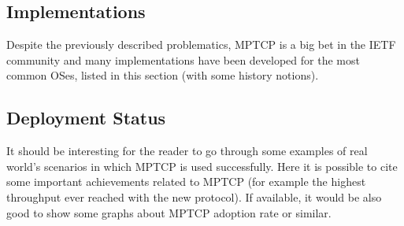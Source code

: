 \subsection{Implementations}
Despite the previously described problematics, MPTCP is a big bet in the IETF community and many implementations have been developed for the most common OSes, listed in this section (with some history notions).

\subsection{Deployment Status}
It should be interesting for the reader to go through some examples of real world's scenarios in which MPTCP is used successfully. Here it is possible to cite some important achievements related to MPTCP (for example the highest throughput ever reached with the new protocol).
If available, it would be also good to show some graphs about MPTCP adoption rate or similar.